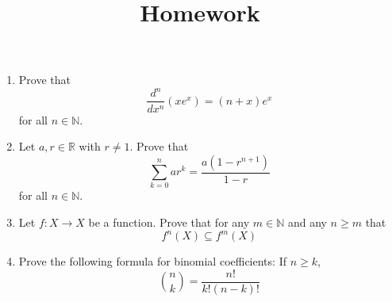 \documentclass[12pt]{amsart}
\theoremstyle{definition}
\begin{document}
\title{Homework}

\maketitle

\begin{enumerate}
	\item Prove that 
	\begin{displaymath}
		\frac{d^n}{dx^n} (xe^x) = (n+x)e^x
	\end{displaymath}
		for all $n \in \mathbb{N}$.
	\item Let $a,r \in \mathbb{R}$ with $r \neq 1$. Prove that 
	\begin{displaymath}
		\sum_{k=0}^n a r^k = \frac{a(1-r^{n+1})}{1-r}
	\end{displaymath}
		for all $n \in \mathbb{N}$. 
	\item Let $f : X \to X$ be a function. Prove 
		that for any $m \in \mathbb{N}$ and any $n \geq m$ 
		that 
	\begin{displaymath}
		f^n(X) \subseteq f^m(X) 
	\end{displaymath}
	\item Prove the following formula for binomial coefficients: 
		If $n \geq k$, 
	\begin{displaymath}
		\binom{n}{k} = \frac{n!}{k!(n-k)!} 
	\end{displaymath}
\end{enumerate}
\end{document}
